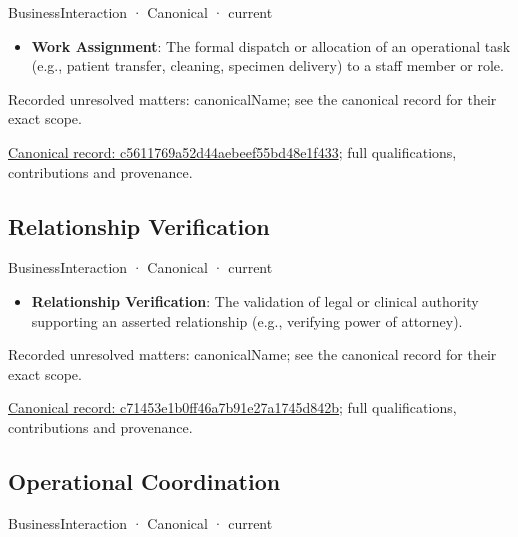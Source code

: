 \label{element:c5611769a52d44aebeef55bd48e1f433}
{\small BusinessInteraction · Canonical · current}\par

\begin{itemize}


\item \textbf{Work Assignment}: The formal dispatch or allocation of an operational task (e.g., patient transfer, cleaning, specimen delivery) to a staff member or role.

\end{itemize}

{\small Recorded unresolved matters: canonicalName; see the canonical record for their exact scope.}\par
{\footnotesize \href{../../../../continuum/business/business-interaction/c5611769a52d44aebeef55bd48e1f433.md}{Canonical record: c5611769a52d44aebeef55bd48e1f433}; full qualifications, contributions and provenance.}\par
\subsection{Relationship Verification}

\label{element:c71453e1b0ff46a7b91e27a1745d842b}
{\small BusinessInteraction · Canonical · current}\par

\begin{itemize}


\item \textbf{Relationship Verification}: The validation of legal or clinical authority supporting an asserted relationship (e.g., verifying power of attorney).

\end{itemize}

{\small Recorded unresolved matters: canonicalName; see the canonical record for their exact scope.}\par
{\footnotesize \href{../../../../continuum/business/business-interaction/c71453e1b0ff46a7b91e27a1745d842b.md}{Canonical record: c71453e1b0ff46a7b91e27a1745d842b}; full qualifications, contributions and provenance.}\par
\subsection{Operational Coordination}

\label{element:cdb5d645d3984eaa8ad5e56a81023c59}
{\small BusinessInteraction · Canonical · current}\par

